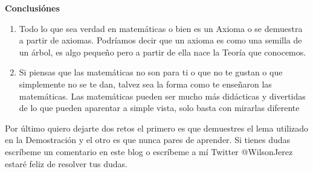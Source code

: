 \documentclass{article}
\begin{document}
\begin{center}
    \textbf{Conclusiónes}
\end{center}
\begin{enumerate}
    \item Todo lo que sea verdad en matemáticas o bien es un Axioma o se demuestra a partir de axiomas.
    Podríamos decir que un axioma es como una semilla de un árbol, es algo pequeño pero a partir de ella nace la Teoría que conocemos. 
    \item Si piensas que las matemáticas no son para ti o que no te gustan o que simplemente no se te dan, talvez sea la forma como te enseñaron
    las matemáticas. Las matemáticas pueden ser mucho más didácticas y divertidas  de lo que pueden aparentar a simple vista, solo basta con mirarlas diferente
\end{enumerate}
Por último quiero dejarte dos retos el primero es que demuestres el lema utilizado en la Demostración y el otro es que nunca pares de aprender. 
Si tienes dudas escríbeme un comentario en este blog o escríbeme a mí Twitter @WilsonJerez estaré feliz de resolver tus dudas.
\end{document}
